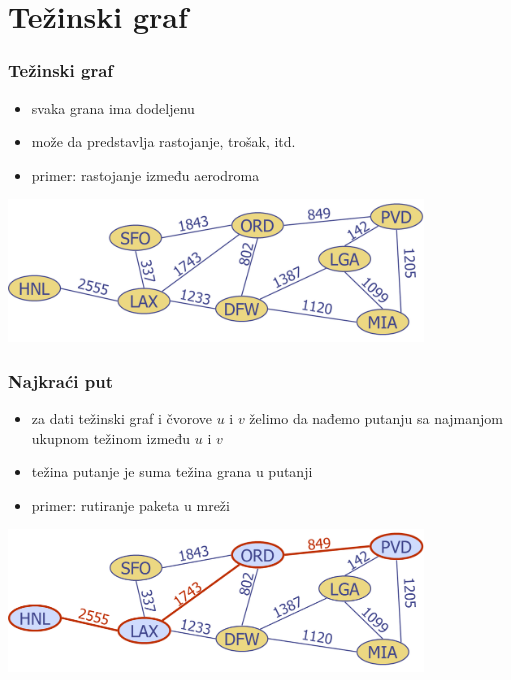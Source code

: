 \documentclass[compress,aspectratio=169]{beamer}
\begin{document}
\section[Težinski graf]{Težinski graf}

\begin{frame}[fragile]
  \frametitle{Težinski graf}
  \begin{itemize}
    \item svaka grana ima dodeljenu 
    \item može da predstavlja rastojanje, trošak, itd.
    \item primer: rastojanje između aerodroma
  \end{itemize}
  \begin{center}
    \includegraphics[width=11cm]{asp-14-pic58.png}
  \end{center}
\end{frame}

\begin{frame}[fragile]
  \frametitle{Najkraći put}
  \begin{itemize}
    \item za dati težinski graf i čvorove $u$ i $v$ želimo da nađemo
      putanju sa najmanjom ukupnom težinom između $u$ i $v$
    \item težina putanje je suma težina grana u putanji
    \item primer: rutiranje paketa u mreži
  \end{itemize}
  \begin{center}
    \includegraphics[width=11cm]{asp-14-pic59.png}
  \end{center}
\end{frame}
\end{document}

